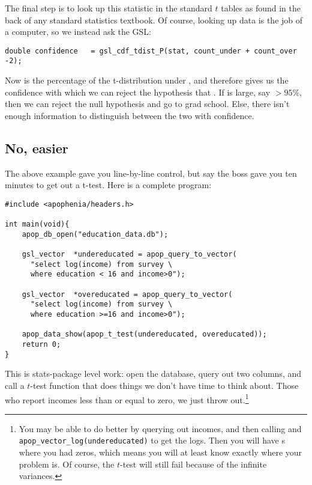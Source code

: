 The final step is to look up this statistic in the standard $t$ tables
as found in the back of any standard statistics textbook. Of course,
looking up data is the job of a computer, so we instead ask the GSL:
\begin{lstlisting}
double confidence   = gsl_cdf_tdist_P(stat, count_under + count_over -2);
\end{lstlisting}
Now  is the percentage of the t-distribution under
, and therefore gives us the confidence with which we can
reject the hypothesis that . If
 is large, say $> 95\%$, then we can reject the null
hypothesis and go to grad school. Else, there isn't enough information
to distinguish between the two with confidence.

\subsection{No, easier} The above example gave you line-by-line
control, but say the boss gave you ten minutes to get out a
t-test. Here is a complete program:

\begin{lstlisting}
#include <apophenia/headers.h>

int main(void){
    apop_db_open("education_data.db");

    gsl_vector	*undereducated = apop_query_to_vector(
      "select log(income) from survey \
      where education < 16 and income>0");

    gsl_vector	*overeducated = apop_query_to_vector(
      "select log(income) from survey \
      where education >=16 and income>0");

    apop_data_show(apop_t_test(undereducated, overeducated));
    return 0;
}
\end{lstlisting}

This is stats-package level work: open the database, query out two
columns, and call a $t$-test function that does things
we don't have time to think about. Those who report incomes less than or
equal to zero, we just throw out.\footnote{You may be able to do better
by querying out incomes, and then calling
    \cinline{apop\_vector\_log(overeducated)} and {\tt
    apop\_vector\_log(undereducated)} to get the logs. Then you will have
    \cinline{GSL\_NEGINF}s where you had zeros, which means you will at least
    know exactly where your problem is. Of course, the $t$-test will
    still fail because of the infinite variances.}

